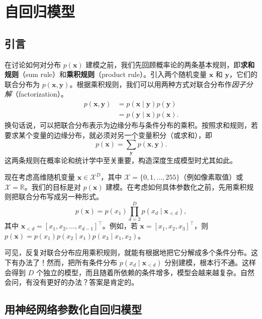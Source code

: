 \chapter{自回归模型}
\section{引言}

在讨论如何对分布 $p(\mathbf{x})$ 建模之前，我们先回顾概率论的两条基本规则，即\textbf{求和规则}（sum rule）和\textbf{乘积规则}（product rule）。引入两个随机变量 $\mathbf{x}$ 和 $\mathbf{y}$，它们的联合分布为 $p(\mathbf{x},\mathbf{y})$。根据乘积规则，我们可以用两种方式对联合分布作\emph{因子分解}（factorization）。
\begin{align}
p(\mathbf{x},\mathbf{y})&=p(\mathbf{x}\mid\mathbf{y})p(\mathbf{y})
\tag{3.1}\label{eq:03-01}\\
&=p(\mathbf{y}\mid\mathbf{x})p(\mathbf{x}).
\tag{3.2}\label{eq:03-02}
\end{align}
换句话说，可以把联合分布表示为边缘分布与条件分布的乘积。按照求和规则，若要求某个变量的边缘分布，就必须对另一个变量积分（或求和），即
\begin{equation}
p(\mathbf{x})=\sum_{\mathbf{y}}p(\mathbf{x},\mathbf{y}).
\tag{3.3}\label{eq:03-03}
\end{equation}
这两条规则在概率论和统计学中至关重要，构造深度生成模型时尤其如此。

现在考虑高维随机变量 $\mathbf{x}\in\mathcal{X}^D$，其中 $\mathcal{X}=\{0,1,\ldots,255\}$（例如像素取值）或 $\mathcal{X}=\mathbb{R}$。我们的目标是对 $p(\mathbf{x})$ 建模。在考虑如何具体参数化之前，先用乘积规则把联合分布写成另一种形式。
\begin{equation}
p(\mathbf{x})=p(x_1)\prod_{d=2}^D p(x_d\mid\mathbf{x}_{<d}),
\tag{3.4}\label{eq:03-04}
\end{equation}
其中 $\mathbf{x}_{<d}=[x_1,x_2,\ldots,x_{d-1}]^\top$。例如，若 $\mathbf{x}=[x_1,x_2,x_3]^\top$，则 $p(\mathbf{x})=p(x_1)p(x_2\mid x_1)p(x_3\mid x_1,x_2)$。

可见，反复对联合分布应用乘积规则，就能有根据地把它分解成多个条件分布。这下有办法了！然而，把所有条件分布 $p(x_d\mid\mathbf{x}_{<d})$ 分别建模，根本行不通。这样会得到 $D$ 个独立的模型，而且随着所依赖的条件增多，模型会越来越复杂。自然会问，有没有更好的办法？答案是肯定的。

\section{用神经网络参数化自回归模型}


